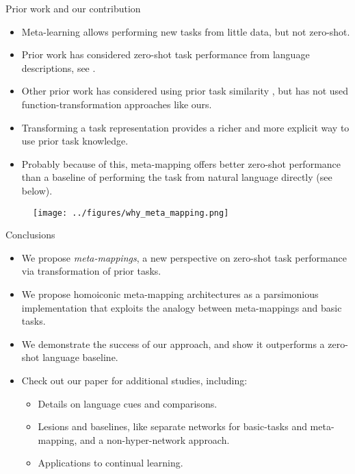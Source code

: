 \documentclass[final]{beamer}
\begin{document}
\begin{frame}[t]{}
\begin{columns}
\begin{column}[t]{0.248\textwidth}
\begin{block}{\huge Prior work and our contribution\vspace{0.2em}}
\vspace{-0.6em}
\begin{itemize}
\item Meta-learning \citep[e.g.][]{Vinyals2016, Finn2017a} allows performing new tasks from little data, but not zero-shot.
\item Prior work has considered zero-shot task performance from language descriptions, see \citet{Xian2018}.
\item Other prior work has considered using prior task similarity \citep[e.g.][]{Pal2019}, but has not used function-transformation approaches like ours.
\item Transforming a task representation provides a richer and more explicit way to use prior task knowledge.
\item Probably because of this, meta-mapping offers better zero-shot performance than a baseline of performing the task from natural language directly (see below).
\end{itemize}
\begin{figure}[H]
\centering
\texttt{[image: ../figures/why\_meta\_mapping.png]}
\label{fig_why_meta_mapping}
\end{figure}

\end{block}
\begin{block}{\huge Conclusions\vspace{0.2em}}
\vspace{-0.6em}
\begin{itemize}
\item We propose \emph{meta-mappings}, a new perspective on zero-shot task performance via transformation of prior tasks. 
\item We propose homoiconic meta-mapping architectures as a parsimonious implementation that exploits the analogy between meta-mappings and basic tasks. 
\item We demonstrate the success of our approach, and show it outperforms a zero-shot language baseline.\\[0.4em] 
\item Check out our paper for additional studies, including:
    \begin{itemize}
    \large
    \item Details on language cues and comparisons.
    \item Lesions and baselines, like separate networks for basic-tasks and meta-mapping, and a non-hyper-network approach. 
    \item Applications to continual learning.
    \end{itemize}
\end{itemize}
\end{block}


\end{column}
\end{columns}
\end{frame}
\end{document}
